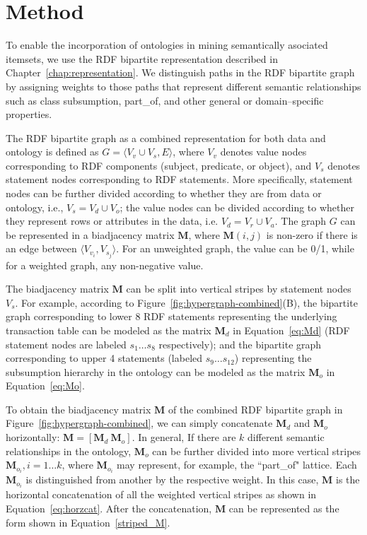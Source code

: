 
\section{Method}

To enable the incorporation of ontologies in mining semantically asociated itemsets, we use the RDF bipartite representation described in Chapter~\ref{chap:representation}. We distinguish paths in the RDF bipartite graph by assigning weights to those paths that represent different semantic relationships such as class subsumption, part\_of, and other general or domain--specific properties.

The RDF bipartite graph as a combined representation for both data and ontology is defined as $G=\langle V_v \cup V_s, E \rangle$, where $V_v$ denotes value nodes corresponding to RDF components (subject, predicate, or object), and $V_s$ denotes statement nodes corresponding to RDF statements. More specifically, statement nodes can be further divided according to whether they are from data or ontology, i.e., $V_s=V_d \cup V_o$; the value nodes can be divided according to whether they represent rows or attributes in the data, i.e. $V_d=V_r \cup V_a$. The graph $G$ can be represented in a biadjacency matrix $\mathbf{M}$, where $\mathbf{M}(i,j)$ is non-zero if there is an edge between $\langle V_{v_i}, V_{s_j} \rangle$. For an unweighted graph, the value can be 0/1, while for a weighted graph, any non-negative value.

The biadjacency matrix $\mathbf{M}$ can be split into vertical stripes by statement nodes $V_s$. For example, according to Figure~\ref{fig:hypergraph-combined}(B), the bipartite graph corresponding to lower 8 RDF statements representing the underlying transaction table can be modeled as the matrix $\mathbf{M}_d$ in Equation~\ref{eq:Md} (RDF statement nodes are labeled $s_1\dots s_8$ respectively); and the bipartite graph corresponding to upper 4 statements (labeled $s_9\dots s_{12}$) representing the subsumption hierarchy in the ontology can be modeled as the matrix $\mathbf{M}_o$ in Equation~\ref{eq:Mo}.

To obtain the biadjacency matrix $\mathbf{M}$ of the combined RDF bipartite graph in Figure~\ref{fig:hypergraph-combined}, we can simply concatenate $\mathbf{M}_d$ and $\mathbf{M}_o$ horizontally: $\mathbf{M}=\left[\mathbf{M}_d~\mathbf{M}_o\right]$. In general, If there are $k$ different semantic relationships in the ontology, $\mathbf{M}_o$ can be further divided into more vertical stripes $\mathbf{M}_{o_i}, i=1\dots k$, where $\mathbf{M}_{o_i}$ may represent, for example, the ``part\_of" lattice. Each $\mathbf{M}_{o_i}$ is  distinguished from another by the respective weight. In this case, $\mathbf{M}$ is the horizontal concatenation of all the weighted vertical stripes as shown in Equation~\ref{eq:horzcat}. After the concatenation, $\mathbf{M}$ can be represented as the form shown in Equation~\ref{striped_M}.

